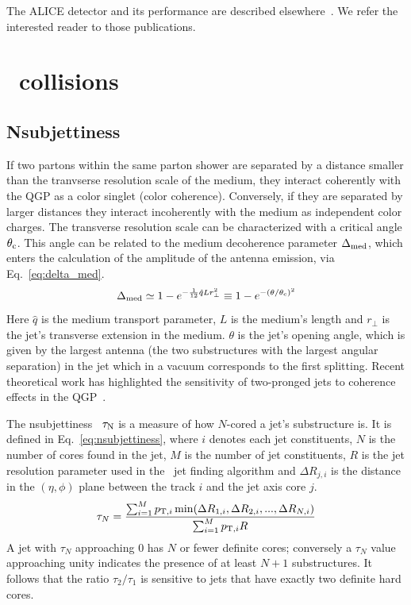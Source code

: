 \documentclass[10pt]{article}
\begin{document}
The ALICE detector and its performance are described elsewhere~\cite{ALICE:2008, ALICE:2014b}. We refer the interested reader to those publications.

\section{\PbPb\ collisions}

\subsection{Nsubjettiness}
\label{sect:nsubjettiness}
If two partons within the same parton shower are separated by a distance smaller than the tranvserse resolution scale of the medium, they interact coherently with the QGP as a color singlet (color coherence). 
Conversely, if they are separated by larger distances they interact incoherently with the medium as independent color charges.
The transverse resolution scale can be characterized with a critical angle $\theta_{\rm c}$. This angle can be related to the medium decoherence parameter $\Delta_{\rm med}$, which enters the calculation of the amplitude of the antenna emission, via Eq.~\ref{eq:delta_med}\cite{Mehtar-Tani:2012, Casalderrey-Solana:2013}.
\begin{equation}
\Delta_{\rm med} \simeq 1 - e^{-\frac{1}{12}\hat{q}Lr^2_{\bot}} \equiv 1 - e^{-(\theta/\theta_{\rm c})^2}
\label{eq:delta_med}
\end{equation}
Here $\hat{q}$ is the medium transport parameter, $L$ is the medium's
length and $r_{\bot}$ is the jet's transverse extension in the medium. $\theta$ is the jet's opening angle, which is given by
the largest antenna (the two substructures with the largest angular separation) in the jet which in a vacuum
corresponds to the first splitting. Recent theoretical work has highlighted the sensitivity of two-pronged jets
to coherence effects in the QGP~\cite{Mehtar-Tani:2016}.

The nsubjettiness~\cite{Thaler:2010} $\tau_{\rm N}$ is a measure of how $N$-cored a jet's substructure is. It is defined in Eq.~\ref{eq:nsubjettiness}, where
$i$ denotes each jet constituents, $N$ is the number of cores found in the jet, $M$ is the number of jet constituents, $R$ is the jet resolution parameter used in the \kt\ jet finding algorithm
and $\Delta R_{j,i}$ is the distance in the $(\eta,\phi)$ plane between the track $i$ and the jet axis core $j$.
\begin{equation}
\tau_N = \frac{\sum^M_{i=1}p_{{\rm T},i}\min(\Delta R_{1,i},\Delta R_{2,i},...,\Delta R_{N,i})}{\sum^M_{i=1}p_{{\rm T},i}R}
\label{eq:nsubjettiness}
\end{equation}
A jet with $\tau_N$ approaching $0$ 
has $N$ or fewer definite cores; conversely a $\tau_N$ value
approaching unity indicates the presence of at least $N + 1$ substructures. 
It follows that the ratio $\tau_2/\tau_1$ is sensitive to jets that have exactly two definite hard cores. 
\end{document}
